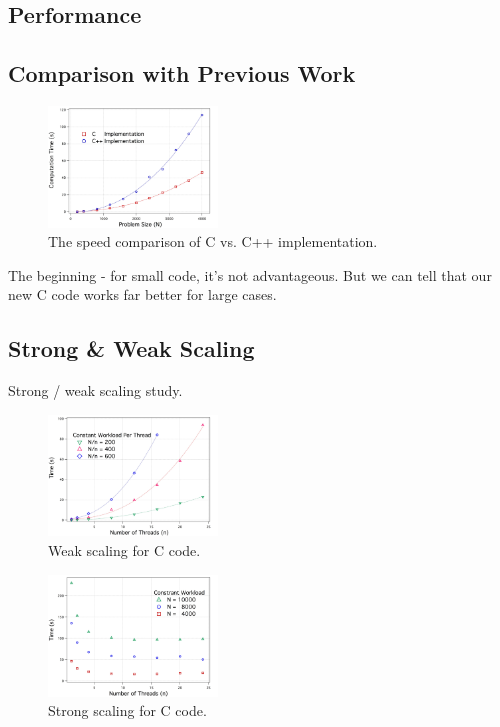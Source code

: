 \documentclass[a4paper,11pt]{article}
\begin{document}
\begin{multicols}{2}
\section{Performance}
	\subsection{Comparison with Previous Work}
	\begin{figure}[H]
        \centering
                \includegraphics[width=0.4\textwidth]{performance.jpg}
                \caption {The speed comparison of C vs. C++ implementation.}
                \label{detector}
	\end{figure}
	The beginning - for small code, it's not advantageous. But we can tell that our new C code works far better for large cases.
	
	\subsection{Strong \& Weak Scaling}
	Strong / weak scaling study.
	\begin{figure}[H]
        \centering
                \includegraphics[width=0.4\textwidth]{weak_scaling.jpg}
                \caption {Weak scaling for C code.}
                \label{detector}
	\end{figure}\begin{figure}[H]
        \centering
                \includegraphics[width=0.4\textwidth]{strong_scaling.jpg}
                \caption {Strong scaling for C code.}
                \label{detector}
	\end{figure}

\end{multicols}
\end{document}
